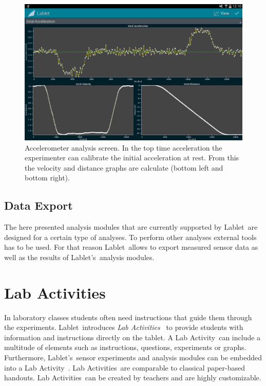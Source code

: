 \documentclass{sigchi}
\newcommand{\lablet}{Lablet\ }
\newcommand{\lablets}{Lablet's\ }
\newcommand{\labactivity}{Lab Activity\ }
\newcommand{\labactivities}{Lab Activities\ }
\begin{document}
\begin{figure}
  \centering
  \includegraphics[width=.99\columnwidth]{AccelerometerAnalysis}
  \caption{Accelerometer analysis screen.  In the top time
    acceleration the experimenter can calibrate the initial
    acceleration at rest.  From this the velocity and distance graphs
    are calculate (bottom left and bottom
    right).\label{fig:AccelerometerAnalysis} }
\end{figure}


\subsection{Data Export}
The here presented analysis modules that are currently supported by \lablet are designed for a certain type of analyses.
To perform other analyses external tools has to be used.
For that reason \lablet allows to export measured sensor data as well as the results of \lablets analysis modules.

\section{Lab Activities}
In laboratory classes students often need instructions that guide them through the experiments.
\lablet introduces {\em \labactivities} to provide students with information and instructions directly on the tablet.
A \labactivity can include a multitude of elements such as instructions, questions, experiments or graphs.
Furthermore, \lablets sensor experiments and analysis modules can be embedded into a \labactivity. 
\labactivities are comparable to classical paper-based handouts.
\labactivities can be created by teachers and are highly customizable.
\end{document}
